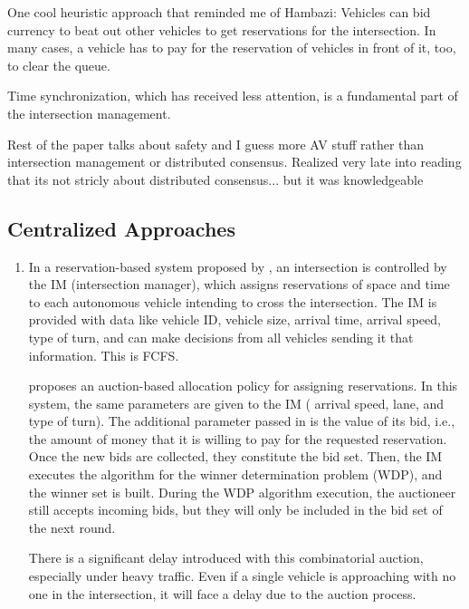 \documentclass[fleqn,10pt]{olplainarticle}
\begin{document}
\begin{enumerate}
One cool heuristic approach that reminded me of Hambazi: Vehicles can bid currency to beat out other vehicles to get reservations for the intersection. In many cases, a vehicle has to pay for the reservation of vehicles in front of it, too, to clear the queue. \cite{Vasirani_2012}



Time synchronization, which has received less attention, is a fundamental part of the intersection management. 


Rest of the paper talks about safety and I guess more AV stuff rather than intersection management or distributed consensus.
Realized very late into reading that its not stricly about distributed consensus... but it was knowledgeable


\end{enumerate}


\subsection{Centralized Approaches}
\begin{enumerate}
    \item
In a reservation-based system proposed by \cite{dresner}, an intersection is controlled by the IM (intersection manager), which assigns reservations of space and time to each autonomous vehicle intending to cross the intersection. The IM is provided with data like vehicle ID, vehicle size, arrival time, arrival speed, type of turn, and can make decisions from all vehicles sending it that information. This is FCFS. 

\cite{Vasirani_2012} proposes an auction-based allocation policy for assigning reservations. In this system, the same parameters are given to the IM ( arrival speed, lane, and type of turn). The additional parameter passed in is the value of its bid, i.e., the amount of money that it is willing to pay for the requested reservation. Once the new bids are collected, they constitute the bid set. Then, the IM executes the algorithm for the winner determination problem (WDP), and the winner set is built. During the WDP algorithm execution, the auctioneer still accepts incoming bids, but they will only be included in the bid set of the next round.

There is a significant delay introduced with this combinatorial auction, especially under heavy traffic. Even if a single vehicle is approaching with no one in the intersection, it will face a delay due to the auction process. 


\end{enumerate}
\end{document}
